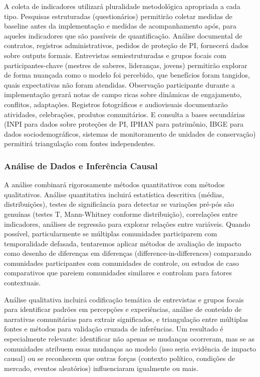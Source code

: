 A coleta de indicadores utilizará pluralidade metodológica apropriada a cada tipo. Pesquisas estruturadas (questionários) permitirão coletar medidas de baseline antes da implementação e medidas de acompanhamento após, para aqueles indicadores que são passíveis de quantificação. Análise documental de contratos, registros administrativos, pedidos de proteção de PI, fornecerá dados sobre outputs formais. Entrevistas semiestruturadas e grupos focais com participantes-chave (mestres de saberes, lideranças, jovens) permitirão explorar de forma nuançada como o modelo foi percebido, que benefícios foram tangidos, quais expectativas não foram atendidas. Observação participante durante a implementação gerará notas de campo ricas sobre dinâmicas de engajamento, conflitos, adaptações. Registros fotográficos e audiovisuais documentarão atividades, celebrações, produtos comunitários. E consulta a bases secundárias (INPI para dados sobre proteções de PI, IPHAN para patrimônio, IBGE para dados sociodemográficos, sistemas de monitoramento de unidades de conservação) permitirá triangulação com fontes independentes.

\subsubsection{Análise de Dados e Inferência Causal}

A análise combinará rigorosamente métodos quantitativos com métodos qualitativos. Análise quantitativa incluirá estatística descritiva (médias, distribuições), testes de significância para detectar se variações pré-pós são genuínas (testes T, Mann-Whitney conforme distribuição), correlações entre indicadores, análises de regressão para explorar relações entre variáveis. Quando possível, particularmente se múltiplas comunidades participarem com temporalidade defasada, tentaremos aplicar métodos de avaliação de impacto como desenho de diferenças em diferenças (difference-in-differences) comparando comunidades participantes com comunidades de controle, ou estudos de caso comparativos que pareiem comunidades similares e controlam para fatores contextuais.

Análise qualitativa incluirá codificação temática de entrevistas e grupos focais para identificar padrões em percepções e experiências, análise de conteúdo de narrativas comunitárias para extrair significados, e triangulação entre múltiplas fontes e métodos para validação cruzada de inferências. Um resultado é especialmente relevante: identificar não apenas se mudanças ocorreram, mas se as comunidades atribuem essas mudanças ao modelo (isso seria evidência de impacto causal) ou se reconhecem que outras forças (contexto político, condições de mercado, eventos aleatórios) influenciaram igualmente ou mais.

